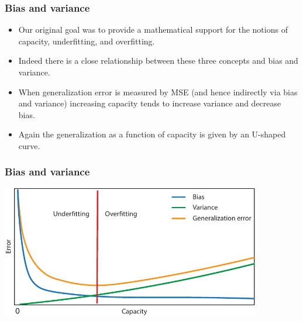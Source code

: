 \documentclass[notes]{beamer}          %
\newif\iffull
\begin{document}
\begin{frame}
\frametitle{Bias and variance}
    \begin{itemize}
        \item Our original goal was to provide a mathematical support for the notions of capacity, underfitting, and overfitting.
        \item Indeed there is a close relationship between these three concepts and bias and variance.
        \item When generalization error is measured by MSE (and hence indirectly via bias and variance) increasing capacity tends to increase variance and decrease bias.
        \item Again the generalization as a function of capacity is given by an U-shaped curve.
    \end{itemize}
\end{frame}


\begin{frame}
\frametitle{Bias and variance}
    \begin{center}
        \includegraphics[width=0.85\textwidth]{figures/week_2/bias_variance.pdf}
    \end{center}
\end{frame}

\iffull
\begin{frame}
\frametitle{Consistency}
    \begin{itemize}
        \item So far we considered fixed size of the training data sets.
        \item We expect that as the number $m$ of training examples grows the estimators will converge to the true value of the parameters.
        \item More formally this is captured in the notion of {\bf consistency}
        $$
        \mbox{plim}_{m \rightarrow \infty} \hat{\theta}_m = \theta
        $$
        where $ \mbox{plim}$ denotes convergence in probability: for any $\epsilon > 0$, $P(\mid \hat{\theta}_m - \theta \mid > \epsilon) \rightarrow 0$ as $m \rightarrow \infty$.
        \item For consistent models the bias decreases as $m$ increases, however a decreasing bias (when $m$ increases) does not imply consistency.
    \end{itemize}
\end{frame}
\fi
\end{document}
